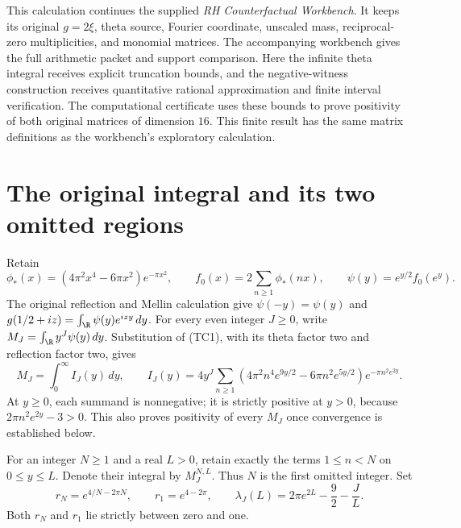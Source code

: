 


This calculation continues the supplied \emph{RH Counterfactual Workbench}.
It keeps its original $g=2\xi$, theta source, Fourier coordinate,
unscaled mass, reciprocal-zero multiplicities, and monomial matrices.
The accompanying workbench gives the full arithmetic packet and support
comparison. Here the infinite theta integral receives explicit truncation
bounds, and the negative-witness construction receives quantitative
rational approximation and finite interval verification.
The computational certificate uses these bounds to prove positivity of
both original matrices of dimension $16$. This finite result has the
same matrix definitions as the workbench's exploratory calculation.

\section{The original integral and its two omitted regions}
Retain
\[
\phi_*(x)=(4\pi^2x^4-6\pi x^2)e^{-\pi x^2},\qquad
f_0(x)=2\sum_{n\ge1}\phi_*(nx),\qquad
\psi(y)=e^{y/2}f_0(e^y).
\tag{TC1}
\]
The original reflection and Mellin calculation give
$\psi(-y)=\psi(y)$ and
$g(1/2+iz)=\int_{\R}\psi(y)e^{izy}\,dy$.
For every even integer $J\ge0$, write $M_J=\int_{\R}y^J\psi(y)\,dy$.
Substitution of (TC1), with its theta factor two and reflection factor
two, gives
\[
M_J=\int_0^\infty I_J(y)\,dy,\qquad
I_J(y)=4y^J\sum_{n\ge1}
\left(4\pi^2n^4e^{9y/2}-6\pi n^2e^{5y/2}\right)
e^{-\pi n^2e^{2y}} .
\tag{TC2}
\]
At $y\ge0$, each summand is nonnegative; it is strictly positive at
$y>0$, because $2\pi n^2e^{2y}-3>0$. This also proves positivity of
every $M_J$ once convergence is established below.

For an integer $N\ge1$ and a real $L>0$, retain exactly the terms
$1\le n<N$ on $0\le y\le L$. Denote their integral by $M_J^{N,L}$.
Thus $N$ is the first omitted integer. Set
\[
r_N=e^{4/N-2\pi N},\qquad r_1=e^{4-2\pi},\qquad
\lambda_J(L)=2\pi e^{2L}-\frac92-\frac{J}{L}.
\tag{TC3}
\]
Both $r_N$ and $r_1$ lie strictly between zero and one.

